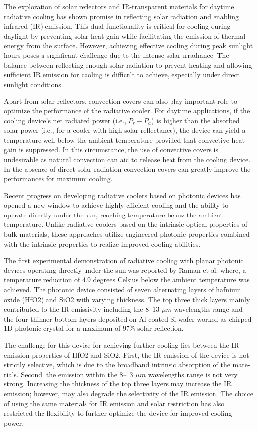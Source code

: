 The exploration of solar reflectors and IR-transparent materials for daytime radiative cooling has shown promise in reflecting solar radiation and enabling infrared (IR) emission. This dual functionality is critical for cooling during daylight by preventing solar heat gain while facilitating the emission of thermal energy from the surface. However, achieving effective cooling during peak sunlight hours poses a significant challenge due to the intense solar irradiance. The balance between reflecting enough solar radiation to prevent heating and allowing sufficient IR emission for cooling is difficult to achieve, especially under direct sunlight conditions.

Apart from solar reflectors, convection covers can also play important role to optimize the performance of the radiative cooler. For daytime applications, if the cooling device’s net radiated power (i.e., $P_r - P_a$) is higher than the absorbed solar power (i.e., for a cooler with high solar reflectance), the device can yield a temperature well below the ambient temperature provided that convective heat gain is suppressed. In this circumstance, the use of convective covers is undesirable as natural convection can aid to release heat from the cooling device. In the absence of direct solar radiation convection covers can greatly improve the performances for maximum cooling.

Recent progress on developing radiative coolers based on photonic devices has opened a new window to achieve highly efficient cooling and the ability to operate directly under the sun, reaching temperature below the ambient temperature. Unlike radiative coolers based on the intrinsic optical properties of bulk materials, these approaches utilize engineered photonic properties combined with the intrinsic properties to realize improved cooling abilities.

The first experimental demonstration of radiative cooling with planar photonic devices operating directly under the sun was reported by Raman et al. where, a temperature reduction of 4.9 degrees Celsius below the ambient temperature was achieved. The photonic device consisted of seven alternating layers of hafnium oxide (HfO2) and SiO2 with varying thickness. The top three thick layers mainly contributed to the IR emissivity including the 8–13 $\mu m$ wavelengths range and the four thinner bottom layers deposited on Al coated Si wafer worked as chirped 1D photonic crystal for a maximum of 97\% solar reflection.

The challenge for this device for achieving further cooling lies between the IR emission properties of HfO2 and SiO2. First, the IR emission of the device is not strictly selective, which is due to the broadband intrinsic absorption of the mate- rials. Second, the emission within the 8–13 $\mu m$ wavelengths range is not very strong. Increasing the thickness of the top three layers may increase the IR emission; however, may also degrade the selectivity of the IR emission. The choice of using the same materials for IR emission and solar restriction has also restricted the flexibility to further optimize the device for improved cooling power.

